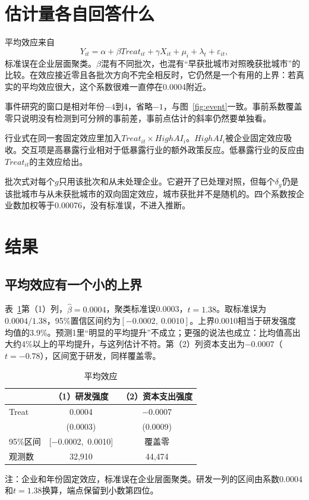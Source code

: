 \documentclass[12pt,hyperref,a4paper,UTF8]{ctexart}
\begin{document}
\section{估计量各自回答什么}

平均效应来自
\begin{equation}
Y_{it}=\alpha+\beta Treat_{it}+\gamma X_{it}+\mu_i+\lambda_t+\varepsilon_{it},
\label{eq:main}
\end{equation}
标准误在企业层面聚类。$\beta$混有不同批次，也混有“早获批城市对照晚获批城市”的比较。在效应接近零且各批次方向不完全相反时，它仍然是一个有用的上界：若真实的平均效应很大，这个系数很难一直停在0.0004附近。

事件研究的窗口是相对年份$-4$到$4$，省略$-1$，与图~\ref{fig:event}一致。事前系数覆盖零只说明没有检测到可分辨的事前差，事前点估计的斜率仍然要单独看\parencite{roth2023trending}。

行业式在同一套固定效应里加入$Treat_{it}\times HighAI_i$。$HighAI_i$被企业固定效应吸收。交互项是高暴露行业相对于低暴露行业的额外政策反应。低暴露行业的反应由$Treat_{it}$的主效应给出。

批次式对每个$g$只用该批次和从未处理企业。它避开了已处理对照，但每个$\delta_g$仍是该批城市与从未获批城市的双向固定效应，城市获批并不是随机的。四个系数按企业数加权等于0.00076，没有标准误，不进入推断。

\section{结果}

\subsection{平均效应有一个小的上界}

表~\ref{tab:main}第（1）列，$\hat\beta=0.0004$，聚类标准误0.0003，$t=1.38$。取标准误为$0.0004/1.38$，95\%置信区间约为$[-0.0002,\ 0.0010]$。上界0.0010相当于研发强度均值的3.9\%。预测1里“明显的平均提升”不成立；更强的说法也成立：比均值高出大约4\%以上的平均提升，与这列估计不符。第（2）列资本支出为$-0.0007$（$t=-0.78$），区间宽于研发，同样覆盖零。

\begin{table}[htbp]
\centering
\caption{平均效应}
\label{tab:main}
\begin{threeparttable}
\begin{tabular*}{\textwidth}{@{\extracolsep{\fill}}lcc}
\toprule
 & （1）研发强度 & （2）资本支出强度 \\
\midrule
Treat & 0.0004 & $-$0.0007 \\
 & (0.0003) & (0.0009) \\
95\%区间 & [$-$0.0002,\ 0.0010] & 覆盖零 \\
观测数 & 32,910 & 44,474 \\
\bottomrule
\end{tabular*}
\begin{tablenotes}
\item 注：企业和年份固定效应，标准误在企业层面聚类。研发一列的区间由系数0.0004和$t=1.38$换算，端点保留到小数第四位。
\end{tablenotes}
\end{threeparttable}
\end{table}
\end{document}

